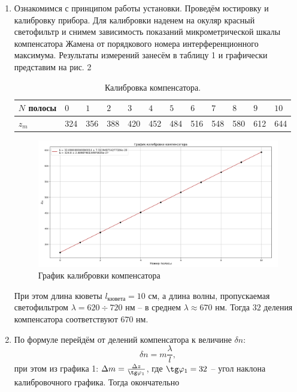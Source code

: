 \documentclass[a4paper,12pt]{article}
\theoremstyle{definition}
\begin{document}
\begin{enumerate}
    \item Ознакомимся с принципом работы установки. Проведём юстировку и калибровку прибора. Для калибровки наденем на окуляр красный светофильтр и снимем зависимость показаний микрометрической шкалы компенсатора Жамена от порядкового номера интерференционного максимума. Результаты измерений занесём в таблицу 1 и графически представим на рис. 2
 
    
    \begin{table}[h]
        \centering
        \caption{Калибровка компенсатора.}
        \begin{tabular}{|*{12}{l|}} \hline
            $N$ полосы & $0$ & $1$ & $2$ & $3$ & $4$ & $5$ & $6$ & $7$ & $8$ & $9$ & $10$ \\ \hline
            $z_m$ & 324 & 356 & 388 & 420 & 452 & 484 & 516 & 548 & 580 & 612 & 644 \\ \hline
        \end{tabular}
    \end{table}
    
\begin{figure}[h]
    \centering
    \includegraphics[width=19cm]{graph1.png}
    \caption{График калибровки компенсатора}
    \label{fig:vac}
\end{figure}

При этом длина кюветы $l_{кювета} = 10$ см, а длина волны, пропускаемая светофильтром $\lambda = 620 \div 720$ нм -- в среднем $\lambda \approx 670$ нм. Тогда $32$ деления компенсатора соответствуют $670$ нм. 

\item По формуле перейдём от делений компенсатора к величине $\delta n$:
\begin{equation}
    \delta n = m\frac{\lambda}{l},
\end{equation}
при этом из графика 1: $\Delta m = \frac{\Delta z}{\tg \varphi_1}$, где $\tg \varphi_1 = 32$ -- угол наклона калибровочного графика. Тогда окончательно


\end{enumerate}
\end{document}
